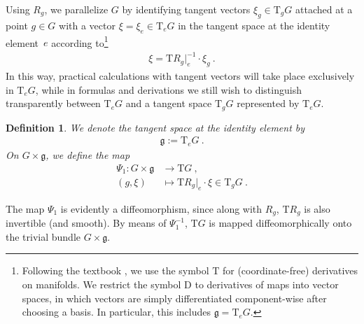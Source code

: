 \documentclass[10pt,a4paper]{article}
\theoremstyle{mytheorem}
\theoremstyle{mydefinition}
\newtheorem{definition}[theorem]{Definition}
\newcommand{\Dt}{\mathrm{D}}
\newcommand{\Tt}{\mathrm{T}}
\newcommand{\fg}{\mathfrak{g}}
\begin{document}
Using $R_g$, we parallelize $G$
by identifying tangent vectors $\xi_g\in\Tt_gG$ attached at a point $g\in G$ with a vector $\xi=\xi_e\in\Tt_eG$ in the tangent space at the identity element~$e$ according to\footnote{
Following the textbook \cite{StorchWiebe2005}, we use the symbol $\Tt$ for (coordinate-free) derivatives on manifolds.
We restrict the symbol $\Dt$ to derivatives of maps into vector spaces, in which vectors are simply differentiated component-wise after choosing a basis.
In particular, this includes $\mathfrak{g}=\Tt_eG$.
}
\begin{align*}
	\xi = \Tt R_g|_e^{-1}\cdot\xi_g
	\ .
\end{align*}
In this way, practical calculations with tangent vectors will take place exclusively in $\Tt_eG$,
while in formulas and derivations we still wish to distinguish transparently between $\Tt_eG$ and a tangent space $\Tt_gG$ represented by $\Tt_eG$.

\begin{definition}
\label{def:Psi1}
We denote the tangent space at the identity element by
\begin{align*}
	\mathfrak{g} := \Tt_eG
	\ .
\end{align*}
On $G\times\fg$, we define the map
\begin{align*}
	\Psi_1: G\times\fg 
	&\rightarrow\Tt G
	\ ,\nonumber\\
	(g, \xi)
	&\mapsto \Tt R_g|_e\cdot\xi
	\in \Tt_gG
	\ .
\end{align*}
\end{definition}

The map $\Psi_1$ is evidently a diffeomorphism,
since along with $R_g$, $\Tt R_g$ is also invertible (and smooth).
By means of $\Psi_1^{-1}$, $\Tt G$ is mapped diffeomorphically onto the trivial bundle $G\times\fg$.
\end{document}
